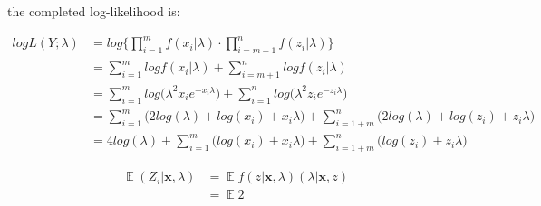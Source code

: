 \documentclass{article}
\newcommand{\E}{\mathop{\mathbb{E}}}
\begin{document}
\newpage 

the completed log-likelihood is:

\begin{align}
    logL(Y;\lambda) &= log \bigg\{ \prod_{i=1}^{m} f(x_i|\lambda)\cdot \prod_{i=m+1}^{n} f(z_i|\lambda) \bigg\} \\ 
    &= \sum_{i=1}^{m} logf(x_i|\lambda) +  \sum_{i=m+1}^{n} logf(z_i|\lambda) \nonumber \\
    &= \sum_{i=1}^{m} log\big(\lambda^2 x_i e^{-x_i\lambda}\big) + \sum_{i=1}^{n} log\big(\lambda^2 z_i e^{-z_i\lambda}\big) \nonumber \\
    &= \sum_{i=1}^{m}\big(2log(\lambda) + log(x_i)+x_i\lambda \big) + \sum_{i=1+m}^{n}\big( 2log(\lambda) + log(z_i) + z_i \lambda\big) \nonumber \\
    &= 4log(\lambda) + \sum_{i=1}^{m}\big(log(x_i) + x_i \lambda\big) + \sum_{i=1+m}^{n}\big(log(z_i) + z_i \lambda\big)
\end{align}


\begin{align}
   \E (Z_i | \boldsymbol x, \lambda) &= \E f(z|\boldsymbol x, \lambda) (\lambda|\boldsymbol x, z) \nonumber \\
    &= \E 2
\end{align}
\end{document}
